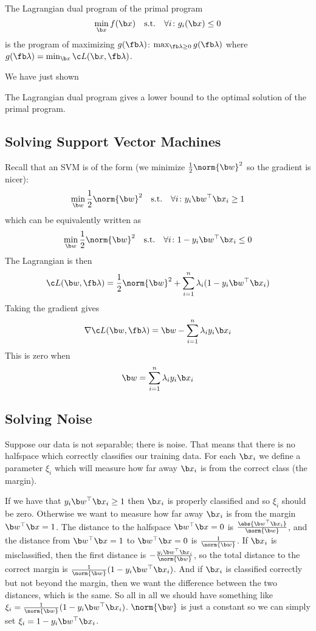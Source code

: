 \bdefn

    The {\emphcolor Lagrangian dual program} of the primal program
    $$ \min_{\b x}f(\b x) \hbox{\quad s.t.\quad} \forall i\colon g_i(\b x)\leq 0 $$
    is the program of maximizing $g(\fb\lambda)$: $\max_{\fb\lambda\geq0}g(\fb\lambda)$ where $g(\fb\lambda)=\min_{\b x}\c L(\b x,\fb\lambda)$.

\edefn

\noindent We have just shown

\bthrm[title=Weak Duality Principle]

    The Lagrangian dual program gives a lower bound to the optimal solution of the primal program.

\ethrm

\subsection{Solving Support Vector Machines}

Recall that an SVM is of the form (we minimize $\frac12\norm{\b w}^2$ so the gradient is nicer):
$$ \min_{\b w}\frac12\norm{\b w}^2 \hbox{\quad s.t.\quad} \forall i\colon y_i\b w^\top\b x_i \geq 1 $$
which can be equivalently written as
$$ \min_{\b w}\frac12\norm{\b w}^2 \hbox{\quad s.t.\quad} \forall i\colon 1-y_i\b w^\top\b x_i \leq 0 $$
The Lagrangian is then
$$ \c L(\b w,\fb\lambda) = \frac12\norm{\b w}^2 + \sum_{i=1}^n\lambda_i(1-y_i\b w^\top\b x_i) $$
Taking the gradient gives
$$ \nabla\c L(\b w,\fb\lambda) = \b w - \sum_{i=1}^n\lambda_i y_i\b x_i $$
This is zero when
$$ \b w = \sum_{i=1}^n\lambda_iy_i\b x_i $$

\subsection{Solving Noise}

Suppose our data is not separable; there is noise.
That means that there is no halfspace which correctly classifies our training data.
For each $\b x_i$ we define a parameter $\xi_i$ which will measure how far away $\b x_i$ is from the correct class (the margin).

If we have that $y_i\b w^\top\b x_i\geq1$ then $\b x_i$ is properly classified and so $\xi_i$ should be zero.
Otherwise we want to measure how far away $\b x_i$ is from the margin $\b w^\top\b x=1$.
The distance to the halfspace $\b w^\top\b x=0$ is $\frac{\abs{\b w^\top\b x_i}}{\norm{\b w}}$, and the distance from $\b w^\top\b x=1$ to $\b w^\top\b x=0$ is $\frac1{\norm{\b w}}$.
If $\b x_i$ is misclassified, then the first distance is $-\frac{y_i\b w^\top\b x_i}{\norm{\b w}}$, so the total distance to the correct margin is $\frac1{\norm{\b w}}(1-y_i\b w^\top\b x_i)$.
And if $\b x_i$ is classified correctly but not beyond the margin, then we want the difference between the two distances, which is the same.
So all in all we should have something like $\xi_i=\frac1{\norm{\b w}}(1-y_i\b w^\top\b x_i)$.
$\norm{\b w}$ is just a constant so we can simply set $\xi_i=1-y_i\b w^\top\b x_i$.

